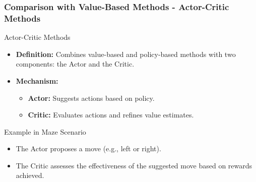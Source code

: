 \documentclass{beamer}
\begin{document}
\begin{frame}[fragile]
    \frametitle{Comparison with Value-Based Methods - Actor-Critic Methods}
    \begin{block}{Actor-Critic Methods}
        \begin{itemize}
            \item \textbf{Definition:} Combines value-based and policy-based methods with two components: the Actor and the Critic.
            \item \textbf{Mechanism:}
            \begin{itemize}
                \item \textbf{Actor:} Suggests actions based on policy.
                \item \textbf{Critic:} Evaluates actions and refines value estimates.
            \end{itemize}
        \end{itemize}
    \end{block}
    \begin{block}{Example in Maze Scenario}
        \begin{itemize}
            \item The Actor proposes a move (e.g., left or right).
            \item The Critic assesses the effectiveness of the suggested move based on rewards achieved.
        \end{itemize}
    \end{block}
\end{frame}
\end{document}

